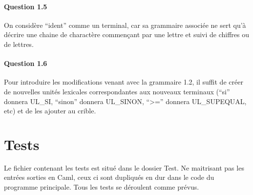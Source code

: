 \documentclass[a4paper]{article}
\begin{document}
\paragraph{Question 1.5} On considère ``ident'' comme un terminal, car sa grammaire associée ne sert qu'à décrire une chaine de charactère commençant par une lettre et suivi de chiffres ou de lettres.

\paragraph{Question 1.6} Pour introduire les modifications venant avec la grammaire 1.2, il suffit de créer de nouvelles unités lexicales correspondantes aux nouveaux terminaux (``si'' donnera UL\_SI, ``sinon'' donnera UL\_SINON, ``>='' donnera UL\_SUPEQUAL, etc) et de les ajouter au crible.

\section{Tests}

Le fichier contenant les tests est situé dans le dossier Test. Ne maitrisant pas les entrées sorties en Caml, ceux ci sont dupliqués en dur dans le code du programme principale. Tous les tests se déroulent comme prévus.
\end{document}
